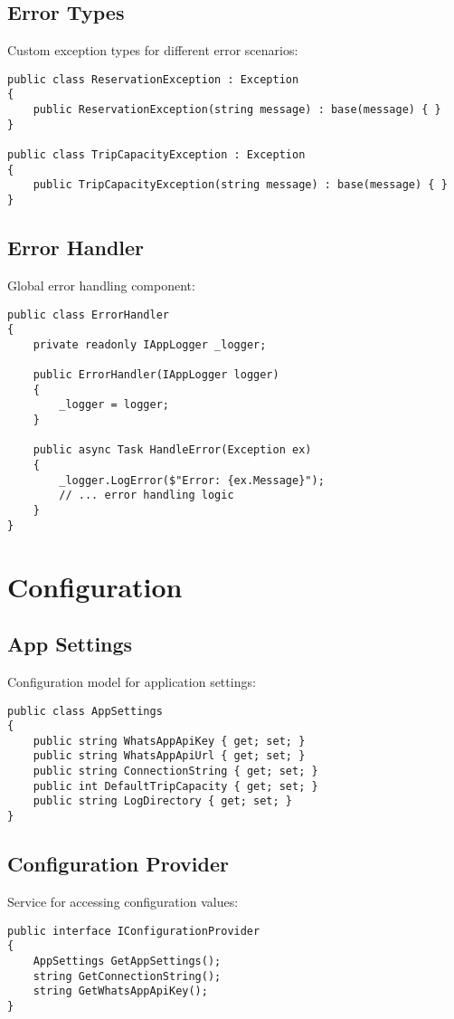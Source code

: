\subsection{Error Types}
Custom exception types for different error scenarios:

\begin{lstlisting}[language=CSharp]
public class ReservationException : Exception
{
    public ReservationException(string message) : base(message) { }
}

public class TripCapacityException : Exception
{
    public TripCapacityException(string message) : base(message) { }
}
\end{lstlisting}

\subsection{Error Handler}
Global error handling component:

\begin{lstlisting}[language=CSharp]
public class ErrorHandler
{
    private readonly IAppLogger _logger;
    
    public ErrorHandler(IAppLogger logger)
    {
        _logger = logger;
    }
    
    public async Task HandleError(Exception ex)
    {
        _logger.LogError($"Error: {ex.Message}");
        // ... error handling logic
    }
}
\end{lstlisting}

\section{Configuration}

\subsection{App Settings}
Configuration model for application settings:

\begin{lstlisting}[language=CSharp]
public class AppSettings
{
    public string WhatsAppApiKey { get; set; }
    public string WhatsAppApiUrl { get; set; }
    public string ConnectionString { get; set; }
    public int DefaultTripCapacity { get; set; }
    public string LogDirectory { get; set; }
}
\end{lstlisting}

\subsection{Configuration Provider}
Service for accessing configuration values:

\begin{lstlisting}[language=CSharp]
public interface IConfigurationProvider
{
    AppSettings GetAppSettings();
    string GetConnectionString();
    string GetWhatsAppApiKey();
}
\end{lstlisting} 